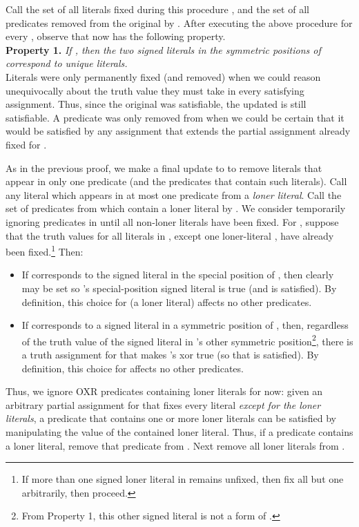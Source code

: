 \documentclass{article}
\begin{document}
   Call the set of all literals fixed during this procedure , and the set of all predicates removed from the original  by .
After executing the above procedure for every , observe that  now has the following property.  \\

\noindent \textbf{Property 1.} \textit{If , then the two signed literals in the symmetric positions of  correspond to unique literals.}\\

Literals were only permanently fixed (and removed) when we could reason unequivocally about the truth value they must take in every satisfying assignment. Thus, since the original  was satisfiable, the updated  is still satisfiable. A predicate was only removed from  when we could be certain that it would be satisfied by any assignment that extends the partial assignment already fixed for .
    
As in the previous proof, we make a final update to   to remove literals that appear in only one predicate (and the predicates that contain such literals). Call any literal  which appears in at most one predicate from  a \textit{loner literal}. Call the set of predicates from  which contain a loner literal by .  We consider temporarily ignoring predicates in  until all non-loner literals have been fixed. For , suppose that the truth values for all literals in , except one loner-literal , have already been fixed.\footnote{If more than one signed loner literal in  remains unfixed, then fix all but one arbitrarily, then proceed.} Then:
\begin{itemize}
\item If  corresponds to the signed literal in the special position of , then clearly  may be set so 's special-position signed literal is true (and  is satisfied). By definition, this choice for  (a loner literal) affects no other predicates.
\item If  corresponds to a signed literal in a symmetric position of , then, regardless of the truth value of the signed literal in 's other symmetric position\footnote{From Property 1, this other signed literal is not a form of .}, there is a truth assignment for  that makes 's xor true (so that  is satisfied). By definition, this choice for  affects no other predicates. 
\end{itemize}

Thus, we ignore OXR predicates containing loner literals for now: given an arbitrary partial assignment for  that fixes every literal \textit{except for the loner literals}, a predicate   that contains one or more loner literals can be satisfied by manipulating the  value of the contained loner literal. 
Thus, if a predicate contains a loner literal, remove that predicate from . Next remove all loner literals from . 
\end{document}
